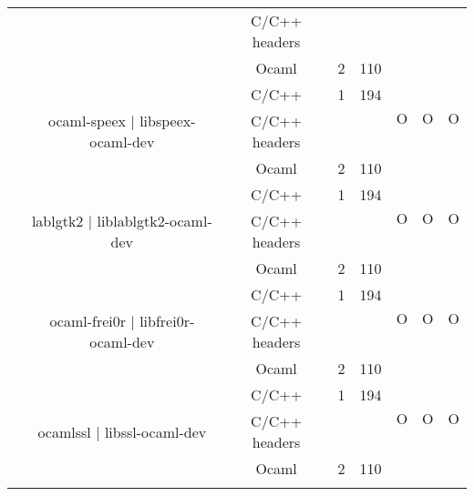 \documentclass[11pt,a4paper]{article}
\begin{document}
\begin{table}[h,t]
\begin{tabular}{|>{\centering}m{3cm}| c|c|r|r| c| c|c|}
 \multirow{2}{*}{O}\\
 \cline{3-5}
 & &                           C/C++ headers &  &  & & & \\

 \cline{3-5}   
 &                                  & Ocaml & 2 & 110  & & & \\       
 \cline{2-8}


 &\multirow{3}{3cm}{ocaml-speex | libspeex-ocaml-dev} & C/C++ & 1 & 194  & \multirow{2}{*}{O} & \multirow{2}{*}{O} &

 \multirow{2}{*}{O}\\
 \cline{3-5}
 & &                           C/C++ headers &  &  & & & \\

 \cline{3-5}   
 &                                  & Ocaml & 2 & 110  & & & \\       
 \cline{2-8}


 &\multirow{3}{3cm}{lablgtk2 | liblablgtk2-ocaml-dev} & C/C++ & 1 & 194  & \multirow{2}{*}{O} & \multirow{2}{*}{O} &

 \multirow{2}{*}{O}\\
 \cline{3-5}
 & &                           C/C++ headers &  &  & & & \\

 \cline{3-5}   
 &                                  & Ocaml & 2 & 110  & & & \\       
 \cline{2-8}

 &\multirow{3}{3cm}{ocaml-frei0r | libfrei0r-ocaml-dev} & C/C++ & 1 & 194  & \multirow{2}{*}{O} & \multirow{2}{*}{O} &

 \multirow{2}{*}{O}\\
 \cline{3-5}
 & &                           C/C++ headers &  &  & & & \\

 \cline{3-5}   
 &                                  & Ocaml & 2 & 110  & & & \\       
 \cline{2-8}



 &\multirow{3}{3cm}{ocamlssl | libssl-ocaml-dev} & C/C++ & 1 & 194  & \multirow{2}{*}{O} & \multirow{2}{*}{O} &

 \multirow{2}{*}{O}\\
 \cline{3-5}
 & &                           C/C++ headers &  &  & & & \\

 \cline{3-5}   
 &                                  & Ocaml & 2 & 110  & & & \\       
 \cline{2-8}



\end{tabular}
\end{table}
\end{document}
